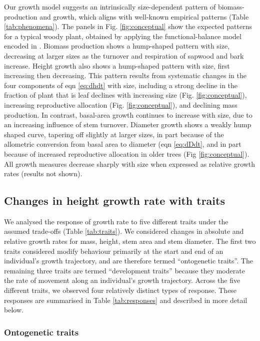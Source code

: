 \documentclass[a4paper,11pt]{article}
\begin{document}
Our growth model suggests an intrinsically size-dependent pattern of biomass-production and growth, which aligns with well-known empirical patterns (Table \ref{tab:phenomena}). The panels in Fig. \ref{fig:conceptual} show the expected patterns for a typical woody plant, obtained by applying the functional-balance model encoded in {\plant}. Biomass production shows a hump-shaped pattern with size, decreasing at larger sizes as the turnover and respiration of sapwood and bark increase. Height growth also shows a hump-shaped pattern with size, first increasing then decreasing. This pattern results from systematic changes in the four components of eqn \ref{eq:dhdt} with size, including a strong decline in the fraction of plant that is leaf declines with increasing size (Fig. \ref{fig:conceptual}), increasing reproductive allocation (Fig. \ref{fig:conceptual}), and declining mass production. In contrast, basal-area growth continues to increase with size, due to an increasing influence of stem turnover. Diameter growth shows a weakly hump shaped curve, tapering off slightly at larger sizes, in part because of the allometric conversion from basal area to diameter (eqn \ref{eq:dDdt}, and in part because of increased reproductive allocation in older trees (Fig \ref{fig:conceptual}). All growth measures decrease sharply with size when expressed as relative growth rates (results not shown).

\subsection{Changes in height growth rate with traits}

We analysed the response of growth rate to five different traits under the assumed trade-offs (Table \ref{tab:traits}). We considered changes in absolute and relative growth rates for mass, height, stem area and stem diameter. The first two traits considered modify behaviour primarily at the start and end of an individual's growth trajectory, and are therefore termed ``ontogenetic traits''. The remaining three traits are termed ``development traits'' because they moderate the rate of movement along an individual's growth trajectory. Across the five different traits, we observed four relatively distinct types of response. These responses are summarised in Table \ref{tab:responses} and described in more detail below.

\subsubsection{Ontogenetic traits}
\end{document}
